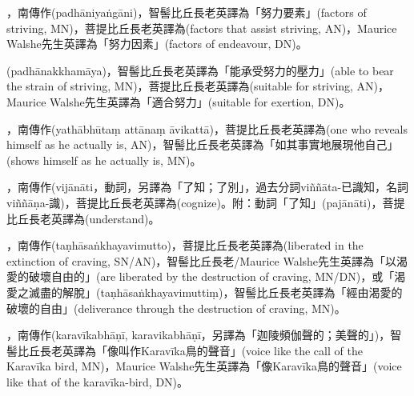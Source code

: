 \startitemgroup[noteitems]
\item{}，南傳作(padhāniyaṅgāni)，智髻比丘長老英譯為「努力要素」(factors of striving, MN)，菩提比丘長老英譯為(factors that assist striving, AN)，Maurice Walshe先生英譯為「努力因素」(factors of endeavour, DN)。
\stopitemgroup

\startitemgroup[noteitems]
\item{}(padhānakkhamāya)，智髻比丘長老英譯為「能承受努力的壓力」(able to bear the strain of striving, MN)，菩提比丘長老英譯為(suitable for striving, AN)，Maurice Walshe先生英譯為「適合努力」(suitable for exertion, DN)。
\stopitemgroup

\startitemgroup[noteitems]
\item{}，南傳作(yathābhūtaṃ attānaṃ āvikattā)，菩提比丘長老英譯為(one who reveals himself as he actually is, AN)，智髻比丘長老英譯為「如其事實地展現他自己」(shows himself as he actually is, MN)。
\stopitemgroup

\startitemgroup[noteitems]
\item{}，南傳作(vijānāti，動詞，另譯為「了知；了別」，過去分詞viññāta-已識知，名詞viññāṇa-識)，菩提比丘長老英譯為(cognize)。附：動詞「了知」(pajānāti)，菩提比丘長老英譯為(understand)。
\stopitemgroup

\startitemgroup[noteitems]
\item{}，南傳作(taṇhāsaṅkhayavimutto)，菩提比丘長老英譯為(liberated in the extinction of craving, SN/AN)，智髻比丘長老/Maurice Walshe先生英譯為「以渴愛的破壞自由的」(are liberated by the destruction of craving, MN/DN)，或「渴愛之滅盡的解脫」(taṇhāsaṅkhayavimuttiṃ)，智髻比丘長老英譯為「經由渴愛的破壞的自由」(deliverance through the destruction of craving, MN)。
\stopitemgroup

\startitemgroup[noteitems]
\item{}，南傳作(karavīkabhāṇī, karavikabhāṇī，另譯為「迦陵頻伽聲的；美聲的」)，智髻比丘長老英譯為「像叫作Karavīka鳥的聲音」(voice like the call of the Karavīka bird, MN)，Maurice Walshe先生英譯為「像Karavīka鳥的聲音」(voice like that of the karavīka-bird, DN)。
\stopitemgroup

